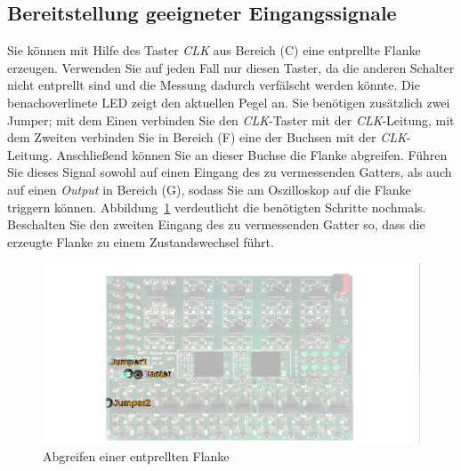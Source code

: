 \documentclass[10pt]{scrreprt}
\begin{document}
    \subsection{Bereitstellung geeigneter Eingangssignale}
    Sie können mit Hilfe des Taster \textit{CLK} aus Bereich (C) eine entprellte Flanke erzeugen.
    Verwenden Sie auf jeden Fall nur diesen Taster, da die anderen Schalter nicht entprellt
    sind und die Messung dadurch verfälscht werden könnte. Die benachoverlinete LED zeigt den
    aktuellen Pegel an. Sie benötigen zusätzlich zwei Jumper; mit dem Einen verbinden Sie
    den \textit{CLK}-Taster mit der \textit{CLK}-Leitung, mit dem Zweiten verbinden Sie in Bereich (F)
    eine der Buchsen mit der \textit{CLK}-Leitung. Anschließend können Sie an dieser Buchse die
    Flanke abgreifen. Führen Sie dieses Signal sowohl auf einen Eingang des zu vermessenden
    Gatters, als auch auf einen \textit{Output} in Bereich (G), sodass Sie am Oszilloskop auf die
    Flanke triggern können. Abbildung~\ref{fig:abb15} verdeutlicht die benötigten Schritte nochmals.
    Beschalten Sie den zweiten Eingang des zu vermessenden Gatter so, dass die erzeugte
    Flanke zu einem Zustandswechsel führt.
    \begin{figure}[H]
        \includegraphics[width=\textwidth]{abb15.png}
        \caption{Abgreifen einer entprellten Flanke}
        \label{fig:abb15}
    \end{figure}
\end{document}
